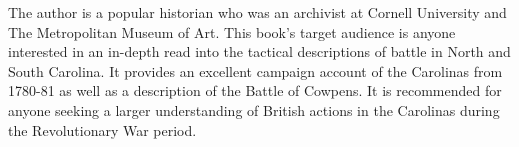 The author is a popular historian who was an archivist at Cornell University and
The Metropolitan Museum of Art.  This book's target audience is anyone
interested in an in-depth read into the tactical descriptions of battle in North
and South Carolina. It provides an excellent campaign account of the Carolinas
from 1780-81 as well as a description of the Battle of Cowpens. It is
recommended for anyone seeking a larger understanding of British actions in the
Carolinas during the Revolutionary War period.

%
